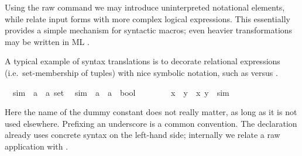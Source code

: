 \begin{isabellebody}
\begin{isamarkuptext}
  Using the raw  command we
  may introduce uninterpreted notational elements, while
   relate input forms with more complex logical
  expressions.  This essentially provides a simple mechanism for
  syntactic macros; even heavier transformations may be written in ML
  \cite{isabelle-ref}.

  \medskip A typical example of syntax translations is to decorate
  relational expressions (i.e.\ set-membership of tuples) with nice
  symbolic notation, such as  versus .%
\end{isamarkuptext}%
\isamarkuptrue%
\isanewline
\ \ sim\ {\isacharcolon}{\isacharcolon}\ {\isachardoublequote}{\isacharparenleft}{\isacharprime}a\ {\isasymtimes}\ {\isacharprime}a{\isacharparenright}\ set{\isachardoublequote}\isanewline
\isanewline
\isamarkupfalse%
\isanewline
\ \ {\isachardoublequote}{\isacharunderscore}sim{\isachardoublequote}\ {\isacharcolon}{\isacharcolon}\ {\isachardoublequote}{\isacharprime}a\ {\isasymRightarrow}\ {\isacharprime}a\ {\isasymRightarrow}\ bool{\isachardoublequote}\ \ \ \ {\isacharparenleft}\ {\isachardoublequote}{\isasymapprox}{\isachardoublequote}\ {}{}{\isacharparenright}\isanewline
\isamarkupfalse%
\isanewline
\ \ {\isachardoublequote}x\ {\isasymapprox}\ y{\isachardoublequote}\ {\isasymrightleftharpoons}\ {\isachardoublequote}{\isacharparenleft}x{\isacharcomma}\ y{\isacharparenright}\ {\isasymin}\ sim{\isachardoublequote}\isamarkupfalse%
%
\begin{isamarkuptext}%
\noindent Here the name of the dummy constant  does
  not really matter, as long as it is not used elsewhere.  Prefixing
  an underscore is a common convention.  The 
  declaration already uses concrete syntax on the left-hand side;
  internally we relate a raw application  with
  .


\end{isamarkuptext}
\end{isabellebody}
